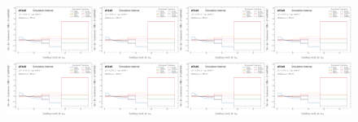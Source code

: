 \begin{figure}[h!]
\centering
\includegraphics[width=0.25\textwidth,page=1]{figures/SimResults/MultiFold_Theory_SystEffect.pdf}\includegraphics[width=0.25\textwidth,page=2]{figures/SimResults/MultiFold_Theory_SystEffect.pdf}\includegraphics[width=0.25\textwidth,page=3]{figures/SimResults/MultiFold_Theory_SystEffect.pdf}\includegraphics[width=0.25\textwidth,page=4]{figures/SimResults/MultiFold_Theory_SystEffect.pdf}\\
\includegraphics[width=0.25\textwidth,page=5]{figures/SimResults/MultiFold_Theory_SystEffect.pdf}\includegraphics[width=0.25\textwidth,page=6]{figures/SimResults/MultiFold_Theory_SystEffect.pdf}\includegraphics[width=0.25\textwidth,page=7]{figures/SimResults/MultiFold_Theory_SystEffect.pdf}\includegraphics[width=0.25\textwidth,page=8]{figures/SimResults/MultiFold_Theory_SystEffect.pdf}\\

\end{figure}
